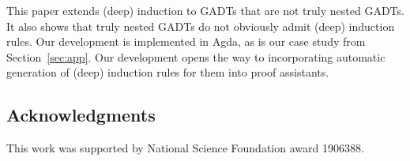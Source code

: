 \documentclass[sigplan,screen]{acmart}
\begin{document}
This paper extends (deep) induction to GADTs that are not truly nested
GADTs. It also shows that truly nested GADTs do not obviously admit
(deep) induction rules. Our development is implemented in Agda, as is
our case study from Section~\ref{sec:app}. Our development opens the
way to incorporating automatic generation of (deep) induction rules
for them into proof assistants.

\subsection*{Acknowledgments}

This work was supported by National Science Foundation award 1906388.



\end{document}

